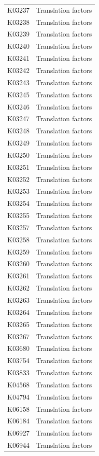 \begin{longtable}{@{}l l@{}}
K03237 & Translation factors \\
K03238 & Translation factors \\
K03239 & Translation factors \\
K03240 & Translation factors \\
K03241 & Translation factors \\
K03242 & Translation factors \\
K03243 & Translation factors \\
K03245 & Translation factors \\
K03246 & Translation factors \\
K03247 & Translation factors \\
K03248 & Translation factors \\
K03249 & Translation factors \\
K03250 & Translation factors \\
K03251 & Translation factors \\
K03252 & Translation factors \\
K03253 & Translation factors \\
K03254 & Translation factors \\
K03255 & Translation factors \\
K03257 & Translation factors \\
K03258 & Translation factors \\
K03259 & Translation factors \\
K03260 & Translation factors \\
K03261 & Translation factors \\
K03262 & Translation factors \\
K03263 & Translation factors \\
K03264 & Translation factors \\
K03265 & Translation factors \\
K03267 & Translation factors \\
K03680 & Translation factors \\
K03754 & Translation factors \\
K03833 & Translation factors \\
K04568 & Translation factors \\
K04794 & Translation factors \\
K06158 & Translation factors \\
K06184 & Translation factors \\
K06927 & Translation factors \\
K06944 & Translation factors \\

\end{longtable}
